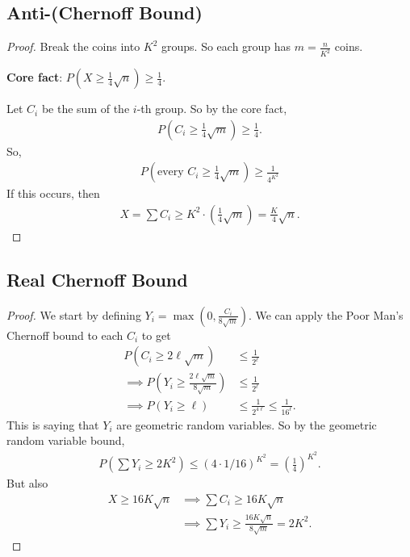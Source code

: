 \documentclass{report}
\begin{document}
\subsection{Anti-(Chernoff Bound)}

\begin{proof}
    Break the coins into $K^2$ groups. So each group has $m = \frac{n}{K^2}$ coins. 

    \noindent \textbf{Core fact}: $P\left( X \geq \frac 14 \sqrt n\right) \geq \frac 14$.
    
    Let $C_i$ be the sum of the $i$-th group. So by the core fact, 
    \begin{align*}
        P\left(C_i \geq \frac 14 \sqrt m\right) \geq \frac 14.
    \end{align*}
    So,
    \begin{align*}
        P\left(\text{every } C_i \geq \frac 14 \sqrt m\right) \geq \frac{1}{4^{K^2}}
    \end{align*}
    If this occurs, then 
    \begin{align*}
        X = \sum C_i \geq K^2 \cdot\left(\frac 14 \sqrt m\right) = \frac K4 \sqrt n.
    \end{align*}
\end{proof}
\newpage 
\subsection{Real Chernoff Bound}
\begin{proof}
    We start by defining $Y_i = \max\left(0, \frac{C_i}{8\sqrt m}\right)$. We can apply the Poor Man's Chernoff bound to each $C_i$ to get
    \begin{align*}
        P(C_i \geq 2\ell \sqrt m) &\leq \frac{1}{2^\ell} \\
        \implies P\left(Y_i \geq \frac{2\ell \sqrt m}{8\sqrt m}\right) &\leq \frac{1}{2^{\ell}} \\
        \implies P(Y_i \geq \ell) & \leq \frac{1}{2^{4\ell}} \leq \frac{1}{16^\ell}.
    \end{align*}
    This is saying that $Y_i$ are geometric random variables. So by the geometric random variable bound,
    \begin{align*}
        P\left(\sum Y_i \geq 2 K^2\right) \leq (4 \cdot 1/16)^{K^2} = \left(\frac 14 \right)^{K^2}.
    \end{align*}
    But also 
    \begin{align*}
        X \geq 16K \sqrt n &\implies \sum C_i \geq 16K \sqrt n \\
        &\implies \sum Y_i \geq \frac{16K \sqrt n}{8 \sqrt m} = 2K^2.
    \end{align*}
\end{proof}
\end{document}
